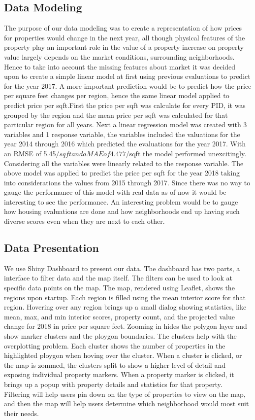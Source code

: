 \documentclass[12pt]{article}
\begin{document}
\subsection{Data Modeling}
The purpose of our data modeling was to create a representation of how
prices for properties would change in the next year, all though physical
features of the property play an important role in the value of a property
increase on property value largely depends on the market conditions, surrounding
neighborhoods. Hence to take into account the missing features about market 
it was decided upon to create a simple linear model at first using previous evaluations
to predict for the year 2017. A more important prediction would be to predict how the price
per square feet changes per region, hence the same linear model applied to predict
price per sqft.First the price per sqft was calculate for every PID, it was grouped by
the region and the mean price per sqft was calculated for that particular region for all years. Next a linear regression model was created with 3 variables and 1 response variable, the variables included the valuations for the year 2014 through 2016 which predicted the evaluations for the year 2017. With an RMSE of 5.45$/sqft and a MAE of 4.477$/sqft the model performed unexcitingly. Considering all the variables were linearly related to the response variable. The above model was applied to predict the price per sqft for the year 2018 taking into considerations the values from 2015 through 2017. Since there was no way to gauge the performance of this model with real data as of now it would be interesting to see the performance.
An interesting problem would be to gauge how housing evaluations are done and how neighborhoods 
end up having such diverse scores even when they are next to each other.

\subsection{Data Presentation}
We use Shiny Dashboard to present our data. The dashboard has two parts, 
a interface to filter data and the map itself. The filters can be used to
look at specific data points on the map. 
The map, rendered using Leaflet, shows the regions upon startup. Each region
is filled using the mean interior score for that region. Hovering over any
region brings up a small dialog showing statistics, like mean, max, and min
interior scores, property count, and the projected value change for 2018 in 
price per square feet. Zooming in hides the polygon layer and show marker 
clusters and the ploygon boundaries. The clusters help with the overplotting
problem. Each cluster shows the number of properties in the highlighted ploygon
when hoving over the cluster. When a cluster is clicked, or the map is zommed,
the clusters split to show a higher level of detail and exposing individual
property markers. When a property marker is clicked, it brings up a
popup with property details and statistics for that property. \\
Filtering will help users pin down on the type of properties to view on the 
map, and then the map will help users determine which neighborhood would 
most suit their needs.
\end{document}
